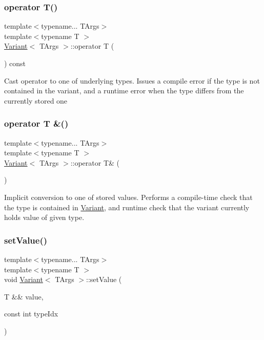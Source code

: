 \subsubsection{\texorpdfstring{operator T()}{operator T()}}
{\footnotesize\ttfamily template$<$typename... T\+Args$>$ \\
template$<$typename T $>$ \\
\hyperlink{classVariant}{Variant}$<$ T\+Args $>$\+::operator T (\begin{DoxyParamCaption}{ }\end{DoxyParamCaption}) const\hspace{0.3cm}{\ttfamily [inline]}}

Cast operator to one of underlying types. Issues a compile error if the type is not contained in the variant, and a runtime error when the type differs from the currently stored one \hypertarget{classVariant_a4a9d805a2f8a07ee673d8db8a9f7a524}{}\label{classVariant_a4a9d805a2f8a07ee673d8db8a9f7a524} 
\subsubsection{\texorpdfstring{operator T \&()}{operator T \&()}}
{\footnotesize\ttfamily template$<$typename... T\+Args$>$ \\
template$<$typename T $>$ \\
\hyperlink{classVariant}{Variant}$<$ T\+Args $>$\+::operator T\& (\begin{DoxyParamCaption}{ }\end{DoxyParamCaption})\hspace{0.3cm}{\ttfamily [inline]}}

Implicit conversion to one of stored values. Performs a compile-\/time check that the type is contained in \hyperlink{classVariant}{Variant}, and runtime check that the variant currently holds value of given type. \hypertarget{classVariant_ab2433a4d048f4809d599986713c5a3d8}{}\label{classVariant_ab2433a4d048f4809d599986713c5a3d8} 
\subsubsection{\texorpdfstring{set\+Value()}{setValue()}}
{\footnotesize\ttfamily template$<$typename... T\+Args$>$ \\
template$<$typename T $>$ \\
void \hyperlink{classVariant}{Variant}$<$ T\+Args $>$\+::set\+Value (\begin{DoxyParamCaption}\item[{T \&\&}]{value,  }\item[{const int}]{type\+Idx }\end{DoxyParamCaption})\hspace{0.3cm}{\ttfamily [inline]}}

